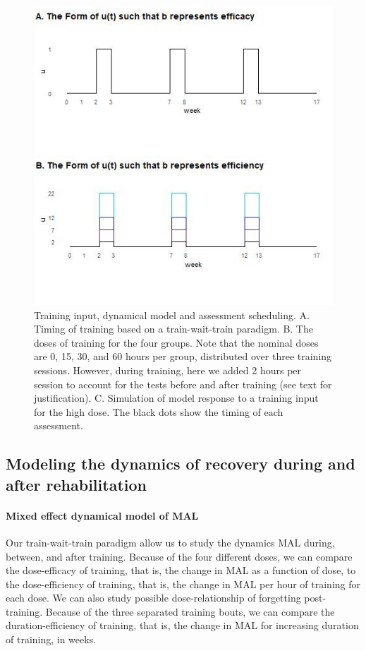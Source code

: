 \begin{figure}
	\centering
	\includegraphics[width=0.9\linewidth]{figures/dosefigure2_inputs}
	\caption[Training input, dynamical model and assessment scheduling.]{Training input, dynamical model and assessment scheduling.
		A. Timing of training based on a train-wait-train paradigm. 
		B. The doses of training for the four groups. Note that the nominal doses are 0, 15, 30, and 60 hours per group, distributed over three training sessions. However, during training, here we added 2 hours per session to account for the tests before and after training (see text for justification). 
		C. Simulation of model response to a training input for the high dose. The black dots show the timing of each assessment.}
	\label{fig:doseinputs}
\end{figure}

\subsection{Modeling the dynamics of recovery during and after rehabilitation}
\paragraph{Mixed effect dynamical model of MAL}
Our train-wait-train paradigm allow us to study the dynamics MAL during, between, and after training. 
Because of the four different doses, we can compare the dose-efficacy of training, that is, the change in MAL as a function of dose, to the dose-efficiency of training, that is, the change in MAL per hour of training for each dose. 
We can also study possible dose-relationship of forgetting post-training. 
Because of the three separated training bouts, we can compare the duration-efficiency of training, that is, the change in MAL for increasing duration of training, in weeks.  


